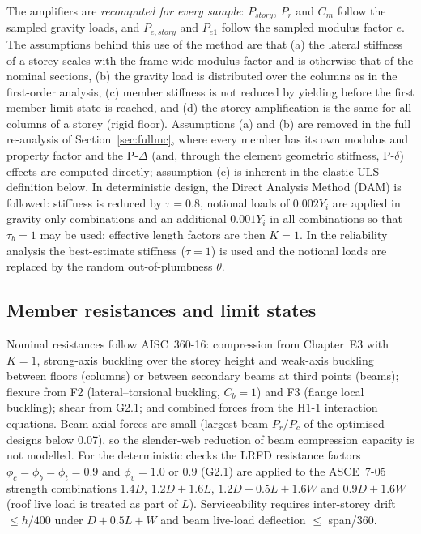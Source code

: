 The amplifiers are \emph{recomputed for every sample}: $P_{story}$, $P_r$ and $C_m$ follow the
sampled gravity loads, and $P_{e,story}$ and $P_{e1}$ follow the sampled modulus factor $e$. The
assumptions behind this use of the method are that (a) the lateral stiffness of a storey scales
with the frame-wide modulus factor and is otherwise that of the nominal sections, (b) the
gravity load is distributed over the columns as in the first-order analysis, (c) member stiffness
is not reduced by yielding before the first member limit state is reached, and (d) the storey
amplification is the same for all columns of a storey (rigid floor). Assumptions (a) and (b) are
removed in the full re-analysis of Section~\ref{sec:fullmc}, where every member has its own modulus
and property factor and the P-$\Delta$ (and, through the element geometric stiffness, P-$\delta$)
effects are computed directly; assumption (c) is inherent in the elastic ULS definition below. In
deterministic design, the Direct Analysis Method (DAM) \citep{AISC360,SurovekMaleck2004} is followed:
stiffness is reduced by $\tau = 0.8$, notional loads of $0.002Y_i$ are applied in gravity-only
combinations and an additional $0.001Y_i$ in all combinations so that $\tau_b=1$ may be used;
effective length factors are then $K=1$. In the reliability analysis the best-estimate stiffness
($\tau=1$) is used and the notional loads are replaced by the random out-of-plumbness $\theta$.

\subsection{Member resistances and limit states}\label{sec:resistance}

Nominal resistances follow AISC~360-16: compression from Chapter~E3 with $K=1$, strong-axis
buckling over the storey height and weak-axis buckling between floors (columns) or between
secondary beams at third points (beams); flexure from F2 (lateral--torsional buckling, $C_b=1$)
and F3 (flange local buckling); shear from G2.1; and combined forces from the H1-1 interaction
equations. Beam axial forces are small (largest beam $P_r/P_c$ of the optimised designs below
0.07), so the slender-web reduction of beam compression capacity is not modelled. For the
deterministic checks the LRFD resistance factors $\phi_c=\phi_b=\phi_t=0.9$ and $\phi_v=1.0$ or
$0.9$ (G2.1) are applied to the ASCE~7-05 \citep{ASCE705} strength combinations $1.4D$,
$1.2D+1.6L$, $1.2D+0.5L\pm1.6W$ and $0.9D\pm1.6W$ (roof live load is treated as part of $L$).
Serviceability requires inter-storey drift $\le h/400$ under $D+0.5L+W$ and beam live-load
deflection $\le$ span/360.

